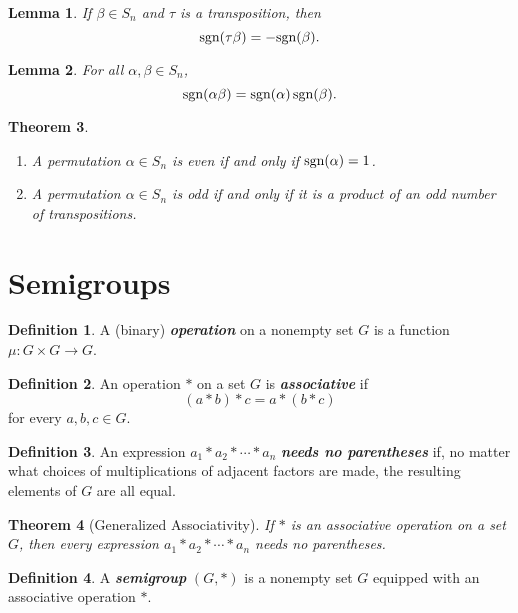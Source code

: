 \documentclass[10pt]{report}
\newtheorem{theorem}{Theorem}[chapter]
\newtheorem{lemma}[theorem]{Lemma}
\theoremstyle{definition}
\newtheorem*{definition}{Definition}
\newcommand{\term}[1]{\textbf{\textit{#1}}}
\begin{document}
\begin{lemma}
	If $\beta\in S_n$ and $\tau$ is a transposition, then
	\[ \textnormal{sgn}(\tau\beta) = -\textnormal{sgn}(\beta). \]
\end{lemma}

\begin{lemma}
	For all $\alpha, \beta\in S_n$,
	\[ \textnormal{sgn}(\alpha\beta) = \textnormal{sgn}(\alpha)\,\textnormal{sgn}(\beta). \]
\end{lemma}

\begin{theorem}
	\quad
	\begin{enumerate}
		\item A permutation $\alpha\in S_n$ is even if and only if $\textnormal{sgn}(\alpha)=1$.
		\item A permutation $\alpha\in S_n$ is odd if and only if it is a product of an odd number of transpositions.
	\end{enumerate}
\end{theorem}

\section{Semigroups}
\begin{definition}
	A (binary) \term{operation} on a nonempty set $G$ is a function $\mu:G\times G\to G$.
\end{definition}

\begin{definition}
	An operation $\ast$ on a set $G$ is \term{associative} if \[(a\ast b)\ast c=a\ast(b\ast c) \] for every $a, b, c\in G$.
\end{definition}

\begin{definition}
	An expression $a_1\ast a_2\ast\cdots\ast a_n$ \term{needs no parentheses} if, no matter what choices of multiplications of adjacent factors are made, the resulting elements of $G$ are all equal.
\end{definition}

\begin{theorem}[Generalized Associativity]
	If $\ast$ is an associative operation on a set $G$, then every expression $a_1\ast a_2\ast\cdots\ast a_n$ needs no parentheses.
\end{theorem}

\begin{definition}
	A \term{semigroup} $(G,\ast)$ is a nonempty set $G$ equipped with an associative operation $\ast$.
\end{definition}
\end{document}
